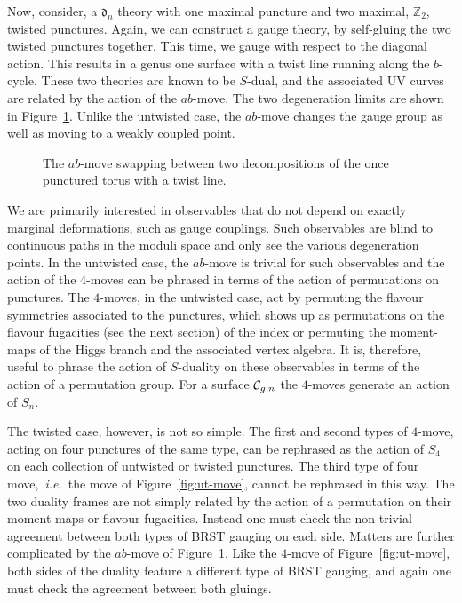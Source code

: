 \documentclass[a4paper]{article}
\def\IZ{\mathbb{Z}}
\def\CC{{\cal C}}
\def\df{\mathfrak{d}}
\def \ie{{\it i.e.}}
\begin{document}
Now, consider, a $\df_n$ theory with one maximal puncture and two maximal, $\IZ_2$, twisted punctures. Again, we can construct a gauge theory, by self-gluing the two twisted punctures together. This time, we gauge with respect to the diagonal action. This results in a genus one surface with a twist line running along the $b$-cycle. These two theories are known to be $S$-dual, and the associated UV curves are related by the action of the $ab$-move. The two degeneration limits are shown in Figure~\ref{fig:ab-move}. Unlike the untwisted case, the $ab$-move changes the gauge group as well as moving to a weakly coupled point.
\begin{figure}[h]
\caption{The $ab$-move swapping between two decompositions of the once punctured torus with a twist line.}
\label{fig:ab-move}
\end{figure}
We are primarily interested in observables that do not depend on exactly marginal deformations, such as gauge couplings. Such observables are blind to continuous paths in the moduli space and only see the various degeneration points. In the untwisted case, the $ab$-move is trivial for such observables and the action of the $4$-moves can be phrased in terms of the action of permutations on punctures. The $4$-moves, in the untwisted case, act by permuting the flavour symmetries associated to the punctures, which shows up as permutations on the flavour fugacities (see the next section) of the index or permuting the moment-maps of the Higgs branch and the associated vertex algebra. It is, therefore, useful to phrase the action of $S$-duality on these observables in terms of the action of a permutation group. For a surface $\CC_{g,n}$ the $4$-moves generate an action of $S_n$.

The twisted case, however, is not so simple. The first and second types of $4$-move, acting on four punctures of the same type, can be rephrased as the action of $S_4$ on each collection of untwisted or twisted punctures. The third type of four move,~\ie\ the move of Figure~\ref{fig:ut-move}, cannot be rephrased in this way. The two duality frames are not simply related by the action of a permutation on their moment maps or flavour fugacities. Instead one must check the non-trivial agreement between both types of BRST gauging on each side. Matters are further complicated by the $ab$-move of Figure~\ref{fig:ab-move}. Like the $4$-move of Figure~\ref{fig:ut-move}, both sides of the duality feature a different type of BRST gauging, and again one must check the agreement between both gluings.
\end{document}
